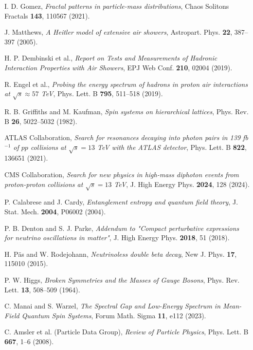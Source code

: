 \documentclass[%
amsmath,amssymb,
aps,
prb,
floatfix,showkeys
]{revtex4-2}
\begin{document}
\begin{thebibliography}{99}
I. D. Gomez, {\it Fractal patterns in particle-mass distributions},
Chaos Solitons Fractals {\bf 143}, 110567 (2021).

J. Matthews, {\it A Heitler model of extensive air showers}, 
Astropart. Phys. {\bf 22}, 387--397 (2005).

H. P. Dembinski et al., {\it Report on Tests and Measurements of Hadronic Interaction Properties with Air Showers},
EPJ Web Conf. {\bf 210}, 02004 (2019).
  
R. Engel et al., {\it Probing the energy spectrum of hadrons in proton air interactions at $\sqrt{s} \approx 57$ TeV},
Phys. Lett. B {\bf 795}, 511--518 (2019).

R. B. Griffiths and M. Kaufman, {\it Spin systems on hierarchical lattices},
Phys. Rev. B {\bf 26}, 5022--5032 (1982).

ATLAS Collaboration, {\it Search for resonances decaying into photon pairs in 139 fb$^{-1}$ of $pp$ collisions at $\sqrt{s}=13$ TeV with the ATLAS detector},
Phys. Lett. B {\bf 822}, 136651 (2021).

CMS Collaboration, {\it Search for new physics in high-mass diphoton events from proton-proton collisions at $\sqrt{s} = 13$ TeV},
J. High Energy Phys. {\bf 2024}, 128 (2024).
  
P. Calabrese and J. Cardy, {\it Entanglement entropy and quantum field theory},
J. Stat. Mech. {\bf 2004}, P06002 (2004).

P. B. Denton and S. J. Parke, {\it Addendum to "Compact perturbative expressions for neutrino oscillations in matter"},
J. High Energy Phys. {\bf 2018}, 51 (2018).

H. Päs and W. Rodejohann, {\it Neutrinoless double beta decay},
New J. Phys. {\bf 17}, 115010 (2015).

P. W. Higgs, {\it Broken Symmetries and the Masses of Gauge Bosons},
Phys. Rev. Lett. {\bf 13}, 508--509 (1964).
  
C. Manai and S. Warzel,
{\it The Spectral Gap and Low-Energy Spectrum in Mean-Field Quantum Spin Systems}, 
Forum Math. Sigma {\bf 11}, e112 (2023).

C. Amsler et al. (Particle Data Group), {\it Review of Particle Physics},
Phys. Lett. B {\bf 667}, 1--6 (2008).


\end{thebibliography}
\end{document}
